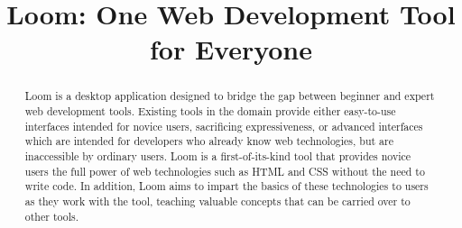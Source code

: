 \documentclass[conference, letterpaper]{IEEEtran}
\begin{document}
%
\title{Loom: One Web Development Tool for Everyone}


\ifx \isAnonymous \undefined
\author{
}
\fi


\maketitle


\begin{abstract}
Loom is a desktop application designed to bridge the gap between beginner and expert web development tools. Existing tools in the domain provide either easy-to-use interfaces intended for novice users, sacrificing expressiveness, or advanced interfaces which are intended for developers who already know web technologies, but are inaccessible by ordinary users. Loom is a first-of-its-kind tool that provides novice users the full power of web technologies such as HTML and CSS without the need to write code. In addition, Loom aims to impart the basics of these technologies to users as they work with the tool, teaching valuable concepts that can be carried over to other tools.
\end{abstract}



\IEEEpeerreviewmaketitle
\end{document}
